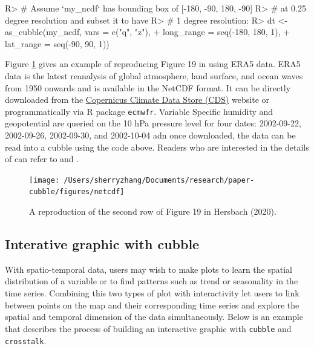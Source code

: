 \documentclass[
]{jss}
\begin{document}
\begin{CodeChunk}
\begin{CodeInput}
R> # Assume `my_ncdf` has bounding box of [-180, -90, 180, -90] 
R> # at 0.25 degree resolution and subset it to have 
R> # 1 degree resolution:
R> dt <- as_cubble(my_ncdf, vars = c("q", "z"), 
+                 long_range = seq(-180, 180, 1), 
+                 lat_range = seq(-90, 90, 1))
\end{CodeInput}
\end{CodeChunk}

Figure \ref{fig:netcdf} gives an example of reproducing Figure 19 in
\citet{hersbach2020era5} using ERA5 data. ERA5 data
\citep{hersbach2020era5} is the latest reanalysis of global atmosphere,
land surface, and ocean waves from 1950 onwards and is available in the
NetCDF format. It can be directly downloaded from the
\href{https://cds.climate.copernicus.eu/cdsapp\#!/dataset/reanalysis-era5-pressure-levels?tab=overview}{Copernicus
Climate Data Store (CDS)} website or programmatically via R package
\texttt{ecmwfr}\citep{ecwmfr}. Variable Specific humidity and
geopotential are queried on the 10 hPa pressure level for four dates:
2002-09-22, 2002-09-26, 2002-09-30, and 2002-10-04 adn once downloaded,
the data can be read into a cubble using the code above. Readers who are
interested in the details of can refer to \citet{simmons2020global} and
\citet{simmons2005ecmwf}.

\begin{CodeChunk}
\begin{figure}

{\centering \texttt{[image: /Users/sherryzhang/Documents/research/paper-cubble/figures/netcdf]} 

}

\caption[A reproduction of the second row of Figure 19 in  Hersbach (2020)]{A reproduction of the second row of Figure 19 in  Hersbach (2020).}\label{fig:netcdf}
\end{figure}
\end{CodeChunk}

\hypertarget{interative-graphic-with-cubble}{%
\subsection{Interative graphic with
cubble}\label{interative-graphic-with-cubble}}

With spatio-temporal data, users may wish to make plots to learn the
spatial distribution of a variable or to find patterns such as trend or
seasonality in the time series. Combining this two types of plot with
interactivity let users to link between points on the map and their
corresponding time series and explore the spatial and temporal dimension
of the data simultaneously. Below is an example that describes the
process of building an interactive graphic with \texttt{cubble} and
\texttt{crosstalk}.
\end{document}
